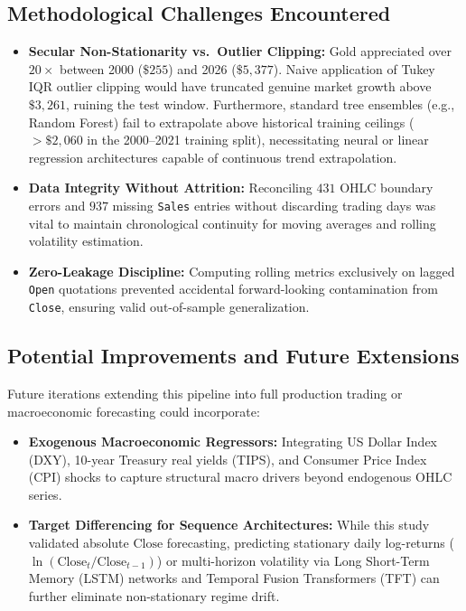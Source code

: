 \documentclass[conference]{IEEEtran}
\begin{document}
\subsection{Methodological Challenges Encountered}
\begin{itemize}
    \item \textbf{Secular Non-Stationarity vs.\ Outlier Clipping:} Gold appreciated over $20\times$ between 2000 ($\$255$) and 2026 ($\$5{,}377$). Naive application of Tukey IQR outlier clipping would have truncated genuine market growth above $\$3{,}261$, ruining the test window. Furthermore, standard tree ensembles (e.g., Random Forest) fail to extrapolate above historical training ceilings ($>\$2{,}060$ in the 2000--2021 training split), necessitating neural or linear regression architectures capable of continuous trend extrapolation.
    \item \textbf{Data Integrity Without Attrition:} Reconciling $431$ OHLC boundary errors and $937$ missing \texttt{Sales} entries without discarding trading days was vital to maintain chronological continuity for moving averages and rolling volatility estimation.
    \item \textbf{Zero-Leakage Discipline:} Computing rolling metrics exclusively on lagged \texttt{Open} quotations prevented accidental forward-looking contamination from \texttt{Close}, ensuring valid out-of-sample generalization.
\end{itemize}

\subsection{Potential Improvements and Future Extensions}
Future iterations extending this pipeline into full production trading or macroeconomic forecasting could incorporate:
\begin{itemize}
    \item \textbf{Exogenous Macroeconomic Regressors:} Integrating US Dollar Index (DXY), 10-year Treasury real yields (TIPS), and Consumer Price Index (CPI) shocks to capture structural macro drivers beyond endogenous OHLC series.
    \item \textbf{Target Differencing for Sequence Architectures:} While this study validated absolute $\text{Close}$ forecasting, predicting stationary daily log-returns ($\ln(\text{Close}_t / \text{Close}_{t-1})$) or multi-horizon volatility via Long Short-Term Memory (LSTM) networks and Temporal Fusion Transformers (TFT) can further eliminate non-stationary regime drift.
\end{itemize}
\end{document}
